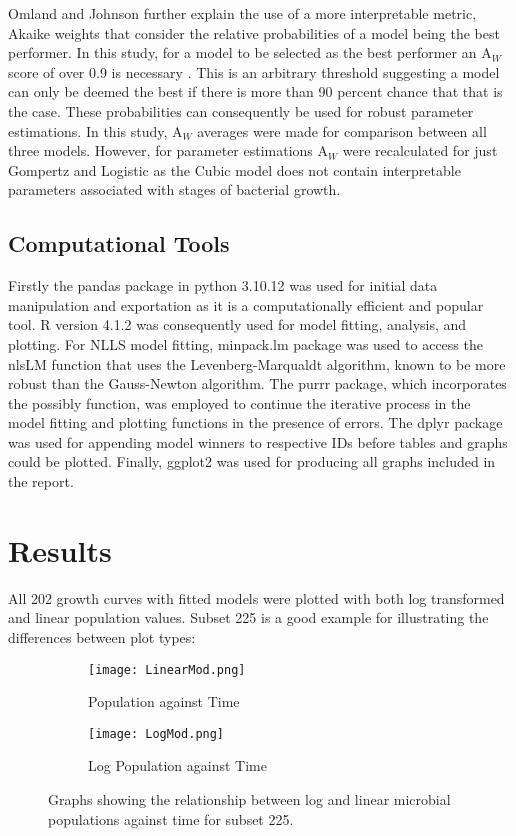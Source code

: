 \documentclass[12pt]{article}
\begin{document}
Omland and Johnson further explain the use of a more interpretable metric, Akaike weights that consider the relative probabilities of a model being the best performer. In this study, for a model to be selected as the best performer an $\mathrm{A}_{\textit{W}}$ score of over 0.9 is necessary \cite{DASH2023103140}. This is an arbitrary threshold suggesting a model can only be deemed the best if there is more than 90 percent chance that that is the case. These probabilities can consequently be used for robust parameter estimations. In this study, $\mathrm{A}_{\textit{W}}$ averages were made for comparison between all three models. However, for parameter estimations $\mathrm{A}_{\textit{W}}$ were recalculated for just Gompertz and Logistic as the Cubic model does not contain interpretable parameters associated with stages of bacterial growth.

\subsection{Computational Tools}

Firstly the pandas package in python 3.10.12 \cite{10.5555/1593511} was used for initial data manipulation and exportation as it is a computationally efficient and popular tool. R version 4.1.2 \cite{R} was consequently used for model fitting,  analysis, and plotting. For NLLS model fitting, minpack.lm package was used to access the nlsLM function that uses the Levenberg-Marqualdt algorithm, known to be more robust than the Gauss-Newton algorithm. The purrr package, which incorporates the possibly function, was employed to continue the iterative process in the model fitting and plotting functions in the presence of errors. The dplyr package was used for appending model winners to respective IDs before tables and graphs could be plotted. Finally, ggplot2 was used for producing all graphs included in the report.

\section{Results}
All 202 growth curves with fitted models were plotted with both log transformed and linear population values. Subset 225 is a good example for illustrating the differences between plot types:

\begin{figure}[H]
    \centering
    \begin{subfigure}{0.5\textwidth}
      \texttt{[image: LinearMod.png]}
      \caption{Population against Time}
    \end{subfigure}%
    \begin{subfigure}{0.5\textwidth}
      \texttt{[image: LogMod.png]}
      \caption{Log Population against Time}
    \end{subfigure}
    \caption{Graphs showing the relationship between log and linear microbial populations against time for subset 225.}
\end{figure}
\end{document}

